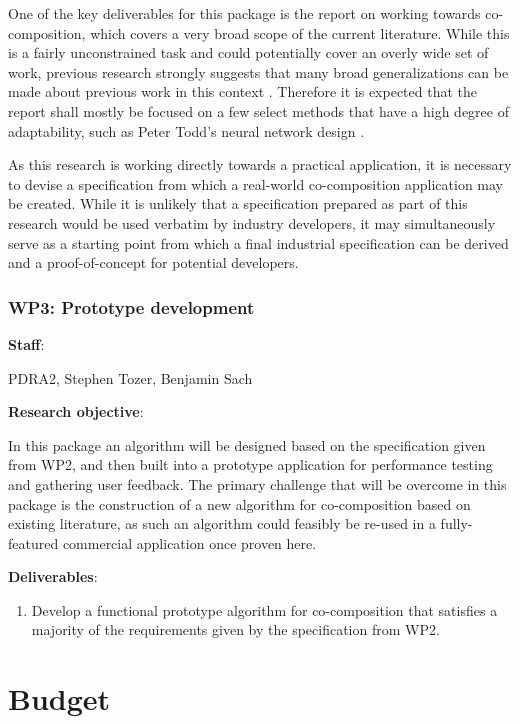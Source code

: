 \documentclass[11pt]{article}
\begin{document}
	One of the key deliverables for this package is the report on working towards co-composition, which covers a very broad scope of the current literature. While this is a fairly unconstrained task and could potentially cover an overly wide set of work, previous research strongly suggests that many broad generalizations can be made about previous work in this context \cite[]{tozer2016algorithmic}. Therefore it is expected that the report shall mostly be focused on a few select methods that have a high degree of adaptability, such as Peter Todd's neural network design \cite[]{todd1989connectionist}.
	
	As this research is working directly towards a practical application, it is necessary to devise a specification from which a real-world co-composition application may be created. While it is unlikely that a specification prepared as part of this research would be used verbatim by industry developers, it may simultaneously serve as a starting point from which a final industrial specification can be derived and a proof-of-concept for potential developers. 
	
	\subsubsection*{WP3: Prototype development}
	
	\noindent \textbf{Staff}:
	\smallskip
	
	PDRA2, Stephen Tozer, Benjamin Sach
	
	\textbf{Research objective}:
	\smallskip
	
	In this package an algorithm will be designed based on the specification given from WP2, and then built into a prototype application for performance testing and gathering user feedback. The primary challenge that will be overcome in this package is the construction of a new algorithm for co-composition based on existing literature, as such an algorithm could feasibly be re-used in a fully-featured commercial application once proven here. 
	
	\bigskip
	\noindent \textbf{Deliverables}:
	\begin{enumerate}
		\item Develop a functional prototype algorithm for co-composition that satisfies a majority of the requirements given by the specification from WP2.
	\end{enumerate}
	
	
	\pagebreak
	\section{Budget}
	
\end{document}
